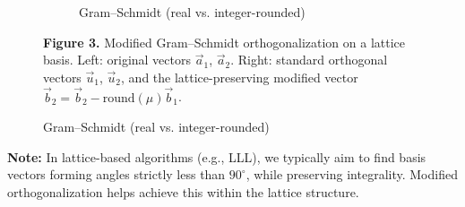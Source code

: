\documentclass[a4paper,12pt]{article}
\begin{document}
\begin{figure}[H]
\begin{subfigure}[t]{0.45\textwidth}
\caption{Gram–Schmidt (real vs. integer-rounded)}
\end{subfigure}
\textbf{Figure 3.} Modified Gram–Schmidt orthogonalization on a lattice basis. Left: original vectors $\vec{a}_1$, $\vec{a}_2$. Right: standard orthogonal vectors $\vec{u}_1$, $\vec{u}_2$, and the lattice-preserving modified vector $\vec{b}_2 = \vec{b}_2 - \text{round}(\mu)\vec{b}_1$.
\end{figure}


\textbf{Note:} In lattice-based algorithms (e.g., LLL), we typically aim to find basis vectors forming angles strictly less than $90^\circ$, while preserving integrality. Modified orthogonalization helps achieve this within the lattice structure.
\end{document}
